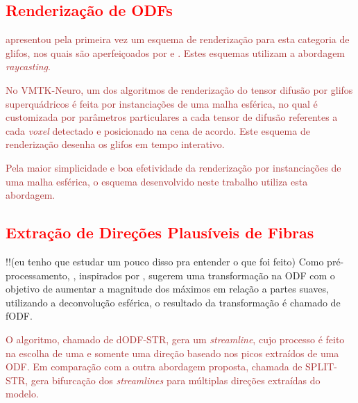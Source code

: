 \documentclass[
    12pt,                %
    oneside,            %
    a4paper,            %
    english,            %
    french,                %
    spanish,            %
    brazil                %
    ]{abntex2}
\begin{document}
\textcolor{red}{\section{Renderização de ODFs}}

\textcolor{brown}{ apresentou pela primeira vez um esquema de renderização para esta categoria de glifos, nos quais são aperfeiçoados por  e . Estes esquemas utilizam a abordagem \textit{raycasting}.}

\textcolor{brown}{No VMTK-Neuro, um dos algoritmos de renderização do tensor difusão por glifos superquádricos é feita por instanciações de uma malha esférica, no qual é customizada por parâmetros particulares a cada tensor de difusão referentes a cada \textit{voxel} detectado e posicionado na cena de acordo. Este esquema de renderização desenha os glifos em tempo interativo.}


\textcolor{brown}{Pela maior simplicidade e boa efetividade da renderização por instanciações de uma malha esférica, o esquema desenvolvido neste trabalho utiliza esta abordagem.}

\textcolor{red}{\section{Extração de Direções Plausíveis de Fibras}}

!!(eu tenho que estudar um pouco disso pra entender o que foi feito)
Como pré-processamento, , inspirados por , sugerem uma transformação na ODF com o objetivo de aumentar a magnitude dos máximos em relação a partes suaves, utilizando a deconvolução esférica, o resultado da transformação é chamado de fODF.


\textcolor{brown}{
 O algoritmo, chamado de dODF-STR, gera um \textit{streamline}, cujo processo é feito na escolha de uma e somente uma direção baseado nos picos extraídos de uma ODF. Em comparação com a outra abordagem proposta, chamada de SPLIT-STR, gera bifurcação dos \textit{streamlines} para múltiplas direções extraídas do modelo.
}
\end{document}
